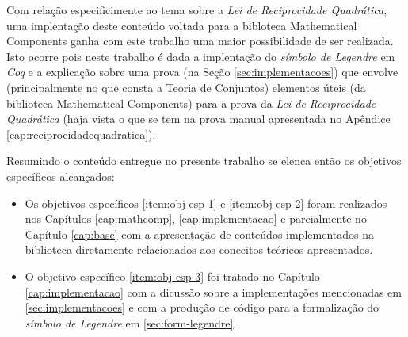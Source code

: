 Com relação especificimente ao tema sobre a \textit{Lei de Reciprocidade Quadrática}, uma implentação deste conteúdo voltada para a bibloteca Mathematical Components ganha com este trabalho uma maior possibilidade de ser realizada. Isto ocorre pois neste trabalho é dada a implentação do \textit{símbolo de Legendre} em \textit{Coq} e a explicação sobre uma prova (na Seção \ref{sec:implementacoes}) que envolve (principalmente no que consta a Teoria de Conjuntos) elementos úteis (da biblioteca Mathematical Components) para a prova da \textit{Lei de Reciprocidade Quadrática} (haja vista o que se tem na prova manual apresentada no Apêndice \ref{cap:reciprocidadequadratica}).

Resumindo o conteúdo entregue no presente trabalho se elenca então os objetivos específicos alcançados: 
\begin{itemize}
    \item Os objetivos específicos \ref{item:obj-esp-1} e \ref{item:obj-esp-2} foram realizados nos Capítulos \ref{cap:mathcomp}, \ref{cap:implementacao} e parcialmente no Capítulo \ref{cap:base} com a apresentação de conteúdos implementados na biblioteca diretamente relacionados aos conceitos teóricos apresentados.  
    
    \item O objetivo específico \ref{item:obj-esp-3} foi tratado no Capítulo \ref{cap:implementacao} com a dicussão sobre a implementações mencionadas em \ref{sec:implementacoes} e com a produção de código para a formalização do \textit{símbolo de Legendre} em \ref{sec:form-legendre}.
    

\end{itemize}

